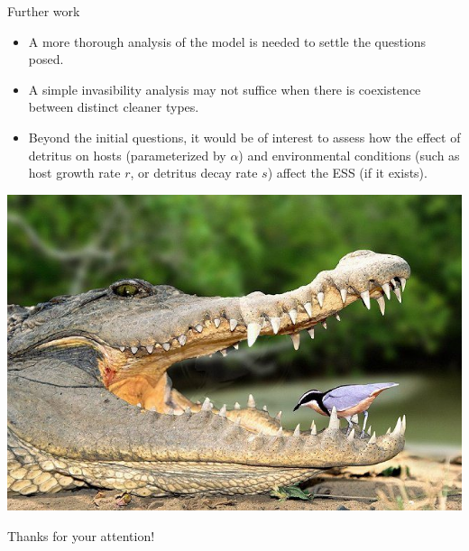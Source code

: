 \documentclass{beamer}
\begin{document}
\begin{frame}{Further work}
    \begin{itemize}
    \item    A more thorough analysis of the model is needed to settle the questions
    posed. 
    
\item A simple invasibility analysis may not suffice
    when there is coexistence between distinct cleaner types.

\item Beyond the initial questions, it would be of interest to assess how the effect of detritus on hosts
    (parameterized by $\alpha$) and environmental conditions (such as host
        growth rate $r$, or detritus decay rate $s$) affect the ESS (if it exists).
    \end{itemize}
\end{frame}

\begin{frame}{}
    \includegraphics[width=.6\textwidth]{crocodile.jpg} \\[4ex]
    \begin{flushright}
    Thanks for your attention!
\end{flushright}
\end{frame}
\end{document}
